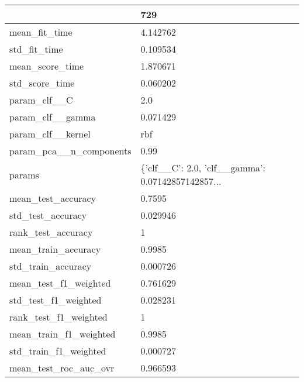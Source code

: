 \begin{tabular}{ll}
\toprule
{} &                                                729 \\
\midrule
mean\_fit\_time               &                                           4.142762 \\
std\_fit\_time                &                                           0.109534 \\
mean\_score\_time             &                                           1.870671 \\
std\_score\_time              &                                           0.060202 \\
param\_clf\_\_C                &                                                2.0 \\
param\_clf\_\_gamma            &                                           0.071429 \\
param\_clf\_\_kernel           &                                                rbf \\
param\_pca\_\_n\_components     &                                               0.99 \\
params                      &  \{'clf\_\_C': 2.0, 'clf\_\_gamma': 0.07142857142857... \\
mean\_test\_accuracy          &                                             0.7595 \\
std\_test\_accuracy           &                                           0.029946 \\
rank\_test\_accuracy          &                                                  1 \\
mean\_train\_accuracy         &                                             0.9985 \\
std\_train\_accuracy          &                                           0.000726 \\
mean\_test\_f1\_weighted       &                                           0.761629 \\
std\_test\_f1\_weighted        &                                           0.028231 \\
rank\_test\_f1\_weighted       &                                                  1 \\
mean\_train\_f1\_weighted      &                                             0.9985 \\
std\_train\_f1\_weighted       &                                           0.000727 \\
mean\_test\_roc\_auc\_ovr       &                                           0.966593 \\

\end{tabular}

